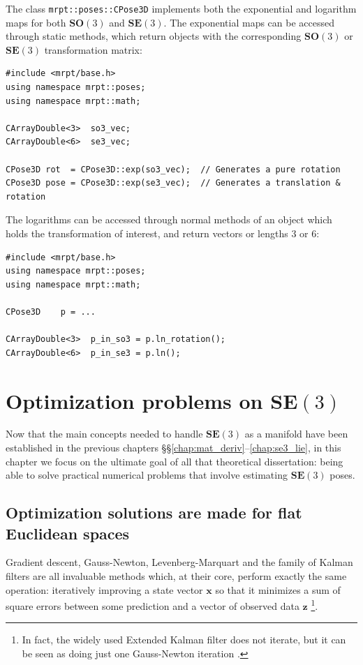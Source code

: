 \documentclass[a4paper,11pt]{report}
\begin{document}
The class \texttt{mrpt::poses::CPose3D} implements both the exponential and logarithm
maps for both $\mathbf{SO}(3)$ and $\mathbf{SE}(3)$.
The exponential maps can be accessed through static methods, which return objects 
with the corresponding $\mathbf{SO}(3)$ or $\mathbf{SE}(3)$ transformation matrix:

\begin{lstlisting}
#include <mrpt/base.h> 
using namespace mrpt::poses; 
using namespace mrpt::math;

CArrayDouble<3>  so3_vec; 
CArrayDouble<6>  se3_vec; 

CPose3D rot  = CPose3D::exp(so3_vec);  // Generates a pure rotation 
CPose3D pose = CPose3D::exp(se3_vec);  // Generates a translation & rotation
\end{lstlisting}


The logarithms can be accessed through normal methods of an object which 
holds the transformation of interest, and return vectors or lengths 3 or 6:

\begin{lstlisting}
#include <mrpt/base.h> 
using namespace mrpt::poses; 
using namespace mrpt::math;

CPose3D    p = ...

CArrayDouble<3>  p_in_so3 = p.ln_rotation();
CArrayDouble<6>  p_in_se3 = p.ln();
\end{lstlisting}




\chapter{Optimization problems on $\mathbf{SE}(3)$}
\label{ch:se3_optim}

Now that the main concepts needed to handle $\mathbf{SE}(3)$
as a manifold have been established in 
the previous chapters \S\S\ref{chap:mat_deriv}--\ref{chap:se3_lie}, 
in this chapter we focus on the ultimate goal of all that theoretical 
dissertation: being able to solve practical numerical 
problems that involve
estimating $\mathbf{SE}(3)$ poses.


\section{Optimization solutions are made for flat Euclidean spaces}

Gradient descent, Gauss-Newton, Levenberg-Marquart and the family of Kalman 
filters are all 
invaluable methods which, at their core, perform exactly the same operation:
iteratively improving a state vector $\mathbf{x}$ so that it minimizes 
a sum of square errors between some prediction and a vector of observed data $\mathbf{z}$
\footnote{In fact, the widely used Extended Kalman filter does not iterate, 
but it can be seen as doing just one Gauss-Newton iteration \cite{bell1993ikf}.}.
\end{document}

